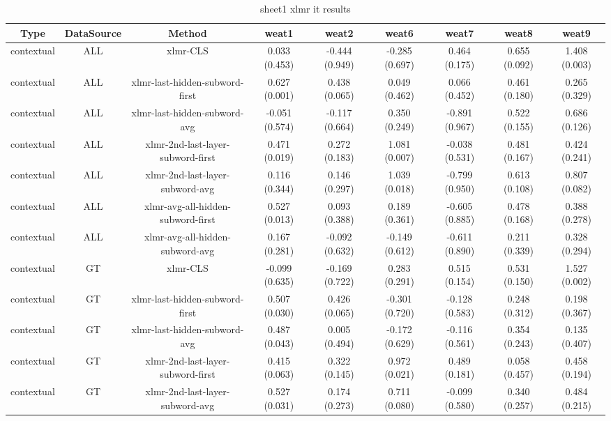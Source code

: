 \begin{sidewaystable}[htb]
    \centering
    \caption{sheet1 xlmr it results}
    \label{appendix_tab:sheet1_xlmr_it_results}
    \small
    \begin{tabular}{@{}ccccccccc@{}}
        \toprule
        Type & DataSource & Method & weat1 & weat2 & weat6 & weat7 & weat8 & weat9 \\
        \midrule
        contextual & ALL & xlmr-CLS & 0.033 (0.453) & -0.444 (0.949) & -0.285 (0.697) & 0.464 (0.175) & 0.655 (0.092) & 1.408 (0.003) \\
        contextual & ALL & xlmr-last-hidden-subword-first & 0.627 (0.001) & 0.438 (0.065) & 0.049 (0.462) & 0.066 (0.452) & 0.461 (0.180) & 0.265 (0.329) \\
        contextual & ALL & xlmr-last-hidden-subword-avg & -0.051 (0.574) & -0.117 (0.664) & 0.350 (0.249) & -0.891 (0.967) & 0.522 (0.155) & 0.686 (0.126) \\
        contextual & ALL & xlmr-2nd-last-layer-subword-first & 0.471 (0.019) & 0.272 (0.183) & 1.081 (0.007) & -0.038 (0.531) & 0.481 (0.167) & 0.424 (0.241) \\
        contextual & ALL & xlmr-2nd-last-layer-subword-avg & 0.116 (0.344) & 0.146 (0.297) & 1.039 (0.018) & -0.799 (0.950) & 0.613 (0.108) & 0.807 (0.082) \\
        contextual & ALL & xlmr-avg-all-hidden-subword-first & 0.527 (0.013) & 0.093 (0.388) & 0.189 (0.361) & -0.605 (0.885) & 0.478 (0.168) & 0.388 (0.278) \\
        contextual & ALL & xlmr-avg-all-hidden-subword-avg & 0.167 (0.281) & -0.092 (0.632) & -0.149 (0.612) & -0.611 (0.890) & 0.211 (0.339) & 0.328 (0.294) \\
        contextual & GT & xlmr-CLS & -0.099 (0.635) & -0.169 (0.722) & 0.283 (0.291) & 0.515 (0.154) & 0.531 (0.150) & 1.527 (0.002) \\
        contextual & GT & xlmr-last-hidden-subword-first & 0.507 (0.030) & 0.426 (0.065) & -0.301 (0.720) & -0.128 (0.583) & 0.248 (0.312) & 0.198 (0.367) \\
        contextual & GT & xlmr-last-hidden-subword-avg & 0.487 (0.043) & 0.005 (0.494) & -0.172 (0.629) & -0.116 (0.561) & 0.354 (0.243) & 0.135 (0.407) \\
        contextual & GT & xlmr-2nd-last-layer-subword-first & 0.415 (0.063) & 0.322 (0.145) & 0.972 (0.021) & 0.489 (0.181) & 0.058 (0.457) & 0.458 (0.194) \\
        contextual & GT & xlmr-2nd-last-layer-subword-avg & 0.527 (0.031) & 0.174 (0.273) & 0.711 (0.080) & -0.099 (0.580) & 0.340 (0.257) & 0.484 (0.215) \\

\end{tabular}
\end{sidewaystable}
